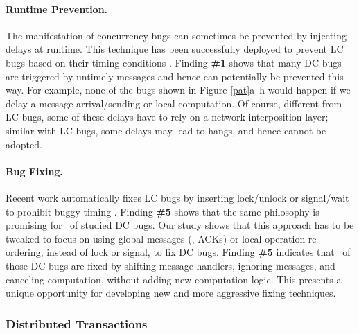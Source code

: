 \paragraph{Runtime Prevention.}

The manifestation of 
concurrency bugs can sometimes be prevented by
injecting delays at runtime.  This technique has been successfully
deployed to prevent LC bugs based on their timing
conditions \cite{DeadlockImmunity, avisio,conair.asplos13}.
%
%
Finding {\bf \#1} shows that many DC bugs are triggered by untimely
messages and hence can potentially be prevented this way.  For
example, none of the bugs shown in Figure \ref{pat}a--h would happen
if we delay a message arrival/sending or local computation.  Of
course, different from LC bugs, some of these delays have to rely on a
network interposition layer; similar with LC bugs, some
delays may lead to hangs, and hence cannot be adopted.

\paragraph{Bug Fixing.}

Recent work automatically fixes LC bugs by inserting lock/unlock or
signal/wait to prohibit buggy timing \cite{cfix.osdi12,
  grail.fse14, wang.osdi08}.
%
%
Finding {\bf \#5} shows that the same philosophy is promising for
\pctFixTime\ of studied DC bugs. Our study 
shows that this approach has to be tweaked to focus on using global
messages (\eg, ACKs) or local operation re-ordering, instead of lock
or signal, to fix DC bugs.  Finding {\bf \#5} indicates that
\pctFixHandEasy\ of those DC bugs are fixed by shifting message handlers,
ignoring messages, and canceling computation, without adding new
computation logic.  This presents a unique opportunity for developing
new and more aggressive fixing techniques.

\subsubsection{Distributed Transactions}
\label{less-tx}



